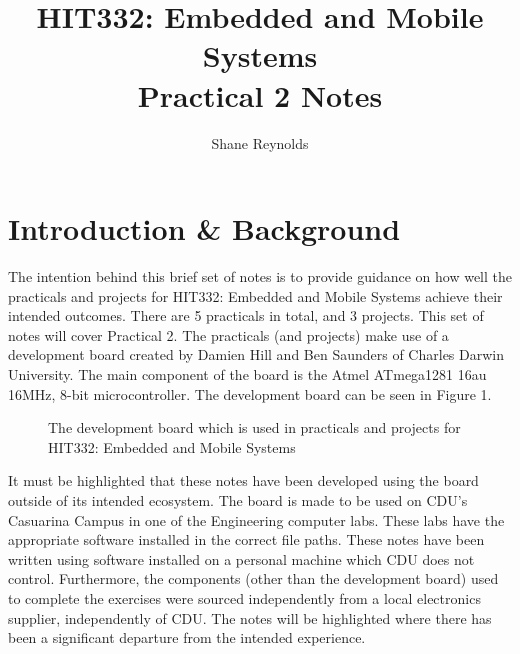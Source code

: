 \documentclass[a4paper]{article}
\begin{document}
\title{HIT332: Embedded and Mobile Systems\\ Practical 2 Notes}
\author{Shane Reynolds}
\maketitle

\tableofcontents

\section{Introduction \& Background}
The intention behind this brief set of notes is to provide guidance on how well the practicals and projects for HIT332: Embedded and Mobile Systems achieve their intended outcomes. There are 5 practicals in total, and 3 projects. This set of notes will cover Practical 2. The practicals (and projects) make use of a development board created by Damien Hill and Ben Saunders of Charles Darwin University. The main component of the board is the Atmel ATmega1281 16au 16MHz, 8-bit microcontroller. The development board can be seen in Figure 1.

\begin{figure}[h]
	\centering
	\caption{The development board which is used in practicals and projects for HIT332: Embedded and Mobile Systems}
\end{figure}

It must be highlighted that these notes have been developed using the board outside of its intended ecosystem. The board is made to be used on CDU's Casuarina Campus in one of the Engineering computer labs. These labs have the appropriate software installed in the correct file paths. These notes have been written using software installed on a personal machine which CDU does not control. Furthermore, the components (other than the development board) used to complete the exercises were sourced independently from a local electronics supplier, independently of CDU. The notes will be highlighted where there has been a significant departure from the intended experience.
\end{document}
